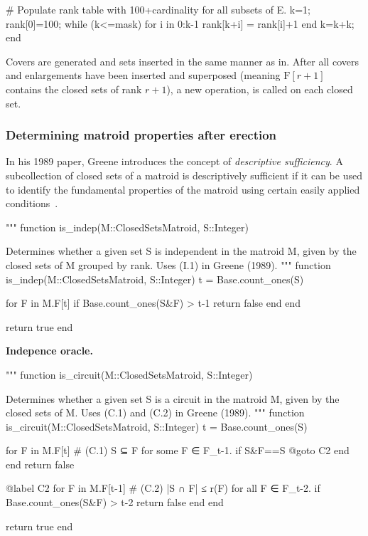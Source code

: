 \begin{jllisting}
  # Populate rank table with 100+cardinality for all subsets of E.
  k=1; rank[0]=100;
  while (k<=mask)
    for i in 0:k-1 rank[k+i] = rank[i]+1 end
    k=k+k;
  end
\end{jllisting}

Covers are generated and sets inserted in the same manner as in\linebreak{}. After all covers and enlargements have been inserted and superposed (meaning $\mathrm{F}[r+1]$ contains the closed sets of rank $r+1$), a new operation,  is called on each closed set.

\skelpar

\subsubsection{Determining matroid properties after erection}
In his 1989 paper, Greene introduces the concept of \textit{descriptive sufficiency}. A subcollection of closed sets of a matroid is descriptively sufficient if it can be used to identify the fundamental properties of the matroid using certain easily applied conditions~\cite{greene-1991}. 
\begin{jllisting}
"""
  function is_indep(M::ClosedSetsMatroid, S::Integer)

Determines whether a given set S is independent in the matroid M, given by the closed sets of M grouped by rank. Uses (I.1) in Greene (1989).
"""
function is_indep(M::ClosedSetsMatroid, S::Integer)
  t = Base.count_ones(S)

  for F in M.F[t]
    if Base.count_ones(S&F) > t-1 return false end
  end

  return true
end
\end{jllisting}

\textbf{Indepence oracle.} \skelpar

\begin{jllisting}
"""
    function is_circuit(M::ClosedSetsMatroid, S::Integer)

Determines whether a given set S is a circuit in the matroid M, given by the closed sets of M. Uses (C.1) and (C.2) in Greene (1989).
"""
function is_circuit(M::ClosedSetsMatroid, S::Integer)
  t = Base.count_ones(S)

  for F in M.F[t] # (C.1) S ⊆ F for some F ∈ F_{t-1}.
    if S&F==S @goto C2 end
  end
  return false

  @label C2
  for F in M.F[t-1] # (C.2) |S ∩ F| ≤ r(F) for all F ∈ F_{t-2}.
    if Base.count_ones(S&F) > t-2 return false end
  end

  return true
end
\end{jllisting}

